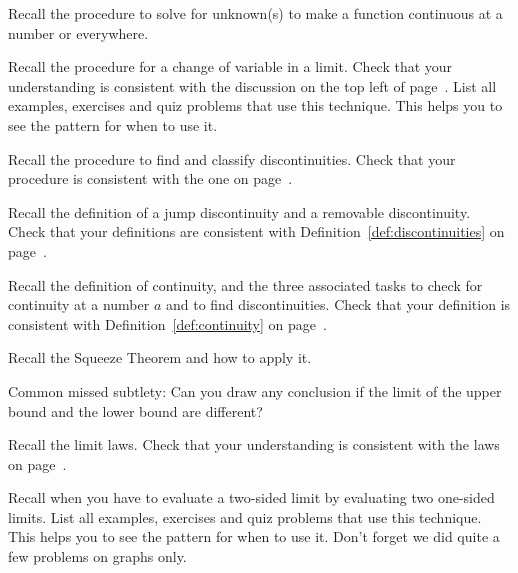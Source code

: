 \documentclass[../main.tex]{subfiles}
\begin{document}
\begin{exercise}
  Recall the procedure to solve for unknown(s) to make a function continuous at a number or everywhere.
\end{exercise}

\begin{exercise}
  Recall the procedure for a change of variable in a limit.
  Check that your understanding is consistent with the discussion on the top left of page~\pageref{sec:change-of-variable}. List all examples, exercises and quiz problems that use this technique. This helps you to see the pattern for when to use it.
\end{exercise}

\begin{exercise}
  Recall the procedure to find and classify discontinuities.
  Check that your procedure is consistent with the one on page~\pageref{technique:classify-discontinuities}.
\end{exercise}

\begin{exercise}
  Recall the definition of a jump discontinuity and a removable discontinuity.
  Check that your definitions are consistent with Definition~\ref{def:discontinuities} on page~\pageref{def:discontinuities}.
\end{exercise}

\begin{exercise}
  Recall the definition of continuity, and the three associated tasks to check for continuity at a number \(a\) and to find discontinuities.
  Check that your definition is consistent with Definition~\ref{def:continuity} on page~\pageref{def:continuity}.
\end{exercise}

\begin{exercise}
  Recall the Squeeze Theorem and how to apply it.

  Common missed subtlety: Can you draw any conclusion if the limit of the upper bound and the lower bound are different?
\end{exercise}

\begin{exercise}
  Recall the limit laws. Check that your understanding is consistent with the laws on page~\pageref{thm:limit-laws}.
\end{exercise}

\begin{exercise}
  Recall when you have to evaluate a two-sided limit by evaluating two one-sided limits. List all examples, exercises and quiz problems that use this technique. This helps you to see the pattern for when to use it. Don't forget we did quite a few problems on graphs only.
\end{exercise}
\end{document}
